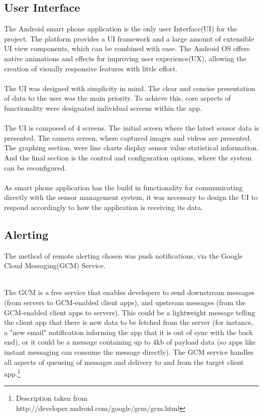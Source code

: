 \documentclass{article}
\begin{document}
\subsection{User Interface}
The Android smart phone application is the only user Interface(UI) for the project. The platform provides a UI framework and a large amount of extensible UI view components, which can be combined with ease. The Android OS offers native animations and effects for improving user experience(UX), allowing the creation of visually responsive features with little effort. \\\\ The UI was designed with simplicity in mind. The clear and concise presentation of data to the user was the main priority. To achieve this, core aspects of functionality were designated individual screens within the app. \\\\ The UI is composed of 4 screens. The initial screen where the latest sensor data is presented. The camera screen, where captured images and videos are presented. The graphing section, were line charts display sensor value statistical information. And the final section is the control and configuration options, where the system can be reconfigured. \\\\ As smart phone application has the build in functionality for communicating directly with the sensor management system, it was necessary to design the UI to respond accordingly to how the application is receiving its data.

\subsection{Alerting}
The method of remote alerting chosen was push notifications, via the Google Cloud Messaging(GCM) Service. \\\ 

The GCM is a free service that enables developers to send downstream messages (from servers to GCM-enabled client apps), and upstream messages (from the GCM-enabled client apps to servers). This could be a lightweight message telling the client app that there is new data to be fetched from the server (for instance, a "new email" notification informing the app that it is out of sync with the back end), or it could be a message containing up to 4kb of payload data (so apps like instant messaging can consume the message directly). The GCM service handles all aspects of queueing of messages and delivery to and from the target client app.\footnote{Description taken from http://developer.android.com/google/gcm/gcm.html}
\end{document}
